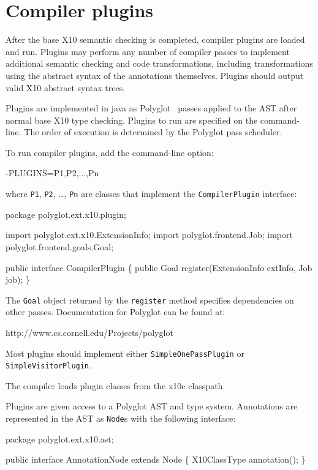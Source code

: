 \section{Compiler plugins}

After the base X10 semantic checking is completed, 
compiler plugins are loaded and run.  Plugins may perform
any number of compiler passes to implement
additional semantic checking and code transformations, including
transformations using the abstract syntax of the annotations
themselves.  Plugins should output valid X10 abstract
syntax trees.

Plugins are implemented in java as
Polyglot~\cite{ncm03} passes applied to the AST
after normal base X10 type checking.
Plugins to run are specified on the command-line.  The order of
execution is determined by the Polyglot pass scheduler.

To run compiler plugins, add the command-line option:
\begin{x10}
  -PLUGINS=P1,P2,...,Pn
\end{x10}
where \texttt{P1}, \texttt{P2}, \dots, \texttt{Pn} are classes that implement the
\texttt{CompilerPlugin} interface:

\begin{x10}
  package polyglot.ext.x10.plugin;

  import polyglot.ext.x10.ExtensionInfo;
  import polyglot.frontend.Job;
  import polyglot.frontend.goals.Goal;

  public interface CompilerPlugin \{
      public Goal register(ExtensionInfo extInfo, Job job);
  \}
\end{x10}

The \texttt{Goal} object returned by the \texttt{register} method specifies dependencies on other passes.
Documentation for Polyglot can be found at:
\begin{x10}
  http://www.cs.cornell.edu/Projects/polyglot
\end{x10}
Most plugins should implement either \texttt{SimpleOnePassPlugin} or
\texttt{SimpleVisitorPlugin}.

The compiler loads plugin classes from the x10c classpath.

Plugins are given access to a Polyglot AST and type system.  Annotations are
represented in the AST as \texttt{Node}s with the following interface:

\begin{x10}
  package polyglot.ext.x10.ast;

  public interface AnnotationNode extends Node \{
    X10ClassType annotation();
  \}
\end{x10}

